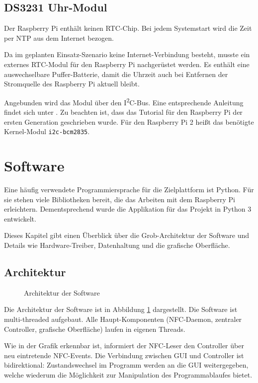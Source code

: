 \documentclass[11pt,a4paper]{IEEEtran}
\begin{document}
\subsection{DS3231 Uhr-Modul}

Der Raspberry Pi enthält keinen RTC-Chip. Bei jedem Systemstart wird die Zeit
per NTP aus dem Internet bezogen.

Da im geplanten Einsatz-Szenario keine Internet-Verbindung besteht, musste ein
externes RTC-Modul für den Raspberry Pi nachgerüstet werden. Es enthält eine
auswechselbare Puffer-Batterie, damit die Uhrzeit auch bei Entfernen der
Stromquelle des Raspberry Pi aktuell bleibt. 

Angebunden wird das Modul über den I\textsuperscript{2}C-Bus. Eine entsprechende
Anleitung findet sich unter \autocite{DS3231Tutorial}. Zu beachten ist, dass
das Tutorial für den Raspberry Pi der ersten Generation geschrieben wurde. Für
den Raspberry Pi 2 heißt das benötigte Kernel-Modul \texttt{i2c-bcm2835}.

\section{Software} 
\label{sec:sw}

Eine häufig verwendete Programmiersprache für die Zielplattform ist Python. Für
sie stehen viele Bibliotheken bereit, die das Arbeiten mit dem Raspberry Pi 
erleichtern. Dementsprechend wurde die Applikation für das Projekt in Python 3
entwickelt.

Dieses Kapitel gibt einen Überblick über die Grob-Architektur der Software und
Details wie Hardware-Treiber, Datenhaltung und die grafische Oberfläche.

\subsection{Architektur}

\begin{figure}[htb]
    \centering
    
    \caption{Architektur der Software}
    \label{fig:arch}
\end{figure}

Die Architektur der Software ist in Abbildung \ref{fig:arch} dargestellt. Die
Software ist multi-threaded aufgebaut. Alle Haupt-Komponenten (NFC-Daemon,
zentraler Controller, grafische Oberfläche) laufen in eigenen Threads. 

Wie in der Grafik erkennbar ist, informiert der NFC-Leser den Controller über
neu eintretende NFC-Events. Die Verbindung zwischen GUI und Controller ist
bidirektional: Zustandswechsel im Programm werden an die GUI weitergegeben, 
welche wiederum die Möglichkeit zur Manipulation des Programmablaufes bietet.
\end{document}
